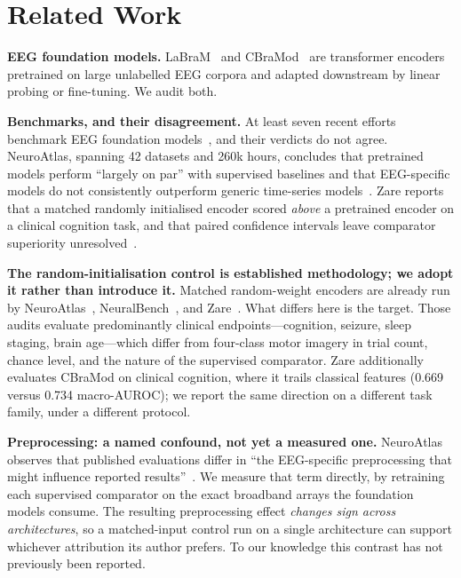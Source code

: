 %

\section{Related Work}

\textbf{EEG foundation models.}
LaBraM~\cite{jiang2024labram} and CBraMod~\cite{wang2025cbramod} are
transformer encoders pretrained on large unlabelled EEG corpora and adapted
downstream by linear probing or fine-tuning. We audit both.

\textbf{Benchmarks, and their disagreement.}
At least seven recent efforts benchmark EEG foundation
models~\cite{wu2025adabrainbench,xiong2025eegfmbench,shen2026brain4fms,%
banville2026neuralbench,kontras2026neuroatlas,lu2026omnieegbench,%
zare2026negativecontrol}, and their verdicts do not agree. NeuroAtlas, spanning
42 datasets and 260k hours, concludes that pretrained models perform ``largely
on par'' with supervised baselines and that EEG-specific models do not
consistently outperform generic time-series
models~\cite{kontras2026neuroatlas}. Zare reports that a matched randomly
initialised encoder scored \emph{above} a pretrained encoder on a clinical
cognition task, and that paired confidence intervals leave comparator
superiority unresolved~\cite{zare2026negativecontrol}.

\textbf{The random-initialisation control is established methodology; we adopt
it rather than introduce it.}
Matched random-weight encoders are already run by
NeuroAtlas~\cite{kontras2026neuroatlas},
NeuralBench~\cite{banville2026neuralbench}, and
Zare~\cite{zare2026negativecontrol}. What differs here is the target. Those
audits evaluate predominantly clinical endpoints---cognition, seizure, sleep
staging, brain age---which differ from four-class motor imagery in trial count,
chance level, and the nature of the supervised comparator. Zare additionally
evaluates CBraMod on clinical cognition, where it trails classical features
(0.669 versus 0.734 macro-AUROC); we report the same direction on a different
task family, under a different protocol.

\textbf{Preprocessing: a named confound, not yet a measured one.}
NeuroAtlas observes that published evaluations differ in ``the EEG-specific
preprocessing that might influence reported
results''~\cite{kontras2026neuroatlas}. We measure that term directly, by
retraining each supervised comparator on the exact broadband arrays the
foundation models consume. The resulting preprocessing effect \emph{changes
sign across architectures}, so a matched-input control run on a single
architecture can support whichever attribution its author prefers. To our
knowledge this contrast has not previously been reported.

